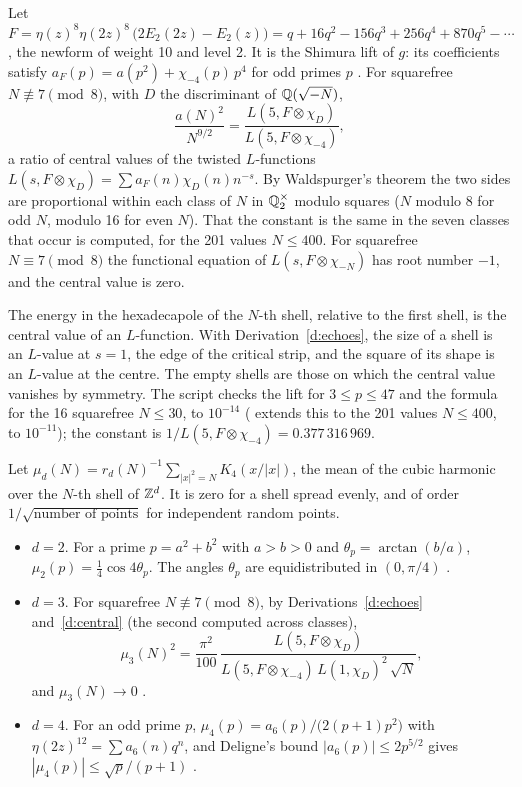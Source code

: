 \documentclass[11pt]{article}
\begin{document}
\begin{derivation}\label{d:central}
Let $F = \eta(z)^8\eta(2z)^8\,\big(2E_2(2z)-E_2(z)\big) = q+16q^2-156q^3+256q^4+870q^5-\cdots$, the newform of weight 10 and level 2.
It is the Shimura lift of $g$: its coefficients satisfy $a_F(p) = a(p^2)+\chi_{-4}(p)\,p^4$ for odd primes $p$ \cite{Shimura}.
For squarefree $N\not\equiv7\pmod8$, with $D$ the discriminant of $\mathbb{Q}(\sqrt{-N})$,
\[
  \frac{a(N)^2}{N^{9/2}} = \frac{L(5,F\otimes\chi_D)}{L(5,F\otimes\chi_{-4})},
\]
a ratio of central values of the twisted $L$-functions $L(s,F\otimes\chi_D) = \sum a_F(n)\chi_D(n)n^{-s}$.
By Waldspurger's theorem \cite{Waldspurger} the two sides are proportional within each class of $N$ in $\mathbb{Q}_2^\times$ modulo squares ($N$ modulo 8 for odd $N$, modulo 16 for even $N$).
That the constant is the same in the seven classes that occur is computed, for the 201 values $N\le400$.
For squarefree $N\equiv7\pmod8$ the functional equation of $L(s,F\otimes\chi_{-N})$ has root number $-1$, and the central value is zero.
\end{derivation}

\physical
The energy in the hexadecapole of the $N$-th shell, relative to the first shell, is the central value of an $L$-function.
With Derivation~\ref{d:echoes}, the size of a shell is an $L$-value at $s=1$, the edge of the critical strip, and the square of its shape is an $L$-value at the centre.
The empty shells are those on which the central value vanishes by symmetry.
The script checks the lift for $3\le p\le47$ and the formula for the 16 squarefree $N\le30$, to $10^{-14}$ ( extends this to the 201 values $N\le400$, to $10^{-11}$); the constant is $1/L(5,F\otimes\chi_{-4}) = 0.377\,316\,969$.

\begin{derivation}\label{d:round}
Let $\mu_d(N) = r_d(N)^{-1}\sum_{|x|^2=N}K_4(x/|x|)$, the mean of the cubic harmonic over the $N$-th shell of $\mathbb{Z}^d$.
It is zero for a shell spread evenly, and of order $1/\sqrt{\text{number of points}}$ for independent random points.
\begin{itemize}
\item $d=2$. For a prime $p = a^2+b^2$ with $a>b>0$ and $\theta_p = \arctan(b/a)$, $\mu_2(p) = \tfrac14\cos4\theta_p$. The angles $\theta_p$ are equidistributed in $(0,\pi/4)$ \cite{Hecke}.
\item $d=3$. For squarefree $N\not\equiv7\pmod8$, by Derivations~\ref{d:echoes} and~\ref{d:central} (the second computed across classes),
\[
  \mu_3(N)^2 = \frac{\pi^2}{100}\,\frac{L(5,F\otimes\chi_D)}{L(5,F\otimes\chi_{-4})\,L(1,\chi_D)^2\,\sqrt N},
\]
and $\mu_3(N)\to0$ \cite{Iwaniec87, Duke}.
\item $d=4$. For an odd prime $p$, $\mu_4(p) = a_6(p)/\big(2(p+1)p^2\big)$ with $\eta(2z)^{12} = \sum a_6(n)q^n$, and Deligne's bound $|a_6(p)|\le2p^{5/2}$ gives $|\mu_4(p)|\le\sqrt p/(p+1)$ \cite{Deligne}.
\end{itemize}
\end{derivation}
\end{document}
